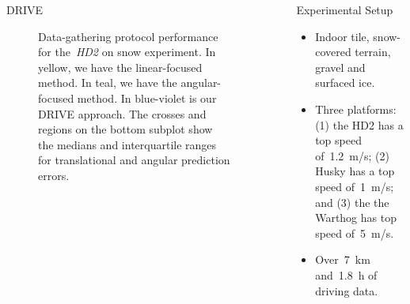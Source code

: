 \documentclass[final,hyperref={pdfpagelabels=false}]{beamer}
\begin{document}
\begin{frame}[t]
\begin{columns}[t]
\begin{column}{.465\textwidth}
\begin{block}{\acf{DRIVE}}
\begin{figure}
\begin{minipage}[b]{.27\textwidth}
			\captionsetup{justification=justified, name=Figure 2}
			\caption{
				Data-gathering protocol performance for the~\emph{HD2} on snow experiment.
				In yellow, we have the linear-focused method.
				In teal, we have the angular-focused method.
				In blue-violet is our DRIVE approach.
				The crosses and regions on the bottom subplot show the medians and interquartile ranges for translational and angular prediction errors.
			}
		\end{minipage}%
	\end{figure}
\end{block}






\end{column} %

\begin{column}{.03\textwidth}\end{column} %
 
\begin{column}{.465\textwidth} %


\vspace{-12.5mm}
\begin{block}{Experimental Setup}
	\begin{itemize}
		\item Indoor tile, snow-covered terrain, gravel and surfaced ice.
		\item Three platforms: (1) the HD2 has a top speed of~\SI{1.2}{\meter / \second}; (2) Husky has a top speed of~\SI{1}{\meter / \second}; and (3) the the Warthog has top speed of~\SI{5}{\meter / \second}.    
		\item Over~\SI[detect-weight,mode=text]{7}{\kilo\meter} and~\SI[detect-weight=true,mode=text]{1.8}{\hour} of driving data.
	\end{itemize}
	

\end{block}
\end{column}
\end{columns}
\end{frame}
\end{document}

